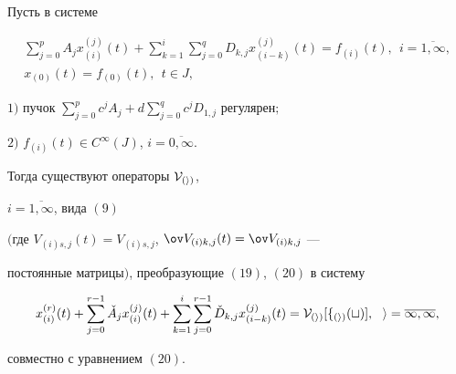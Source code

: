 \begin{thmnonum}


Пусть в системе


\begin{gather}


\sum_{j=0}^{p}{A_{j}x_{(i)}^{(j)}(t)} +


\sum_{k=1}^{i}


{\sum_{j=0}^{q}{D_{k,j}x_{(i-k)}^{(j)}(t)}}=


f_{(i)}(t),\ \ i=\overline{1,\infty}, \\


%


x_{(0)}(t)=f_{(0)}(t),\ \ t \in J,


\end{gather}


\noindent{}$1)$ пучок $\sum\limits_{j=0}^{p}{c^j A_j} +


d \sum\limits_{j=0}^{q}{c^j D_{1,j}}$ регулярен$;$





\noindent{}$2)$ $f_{(i)}(t) \in C^{\infty}(J)$, $i=\overline{0,\infty}$.





Тогда существуют операторы $\cal V_{(i)}$,


$i=\overline{1, \infty}$, вида $(9)$


$($где $V_{(i)s,j}(t)=V_{(i)s,j}$, $\ov V_{(i)k,j}(t)=\ov V_{(i)k,j}$ ---


постоянные матрицы$)$, преобразующие $(19)$, $(20)$ в систему


\begin{equation}


x_{(i)}^{(r)}(t)+


\sum_{j=0}^{r-1}{\check A_{j}x_{(i)}^{(j)}(t)} +


\sum_{k=1}^{i}


{\sum_{j=0}^{r-1}{\check D_{k,j}x_{(i-k)}^{(j)}(t)}}=


\cal V_{(i)}[f_{(i)}(t)], \ \ 


i=\overline{1,\infty},


\end{equation}


совместно с уравнением $(20)$.


\end{thmnonum}





